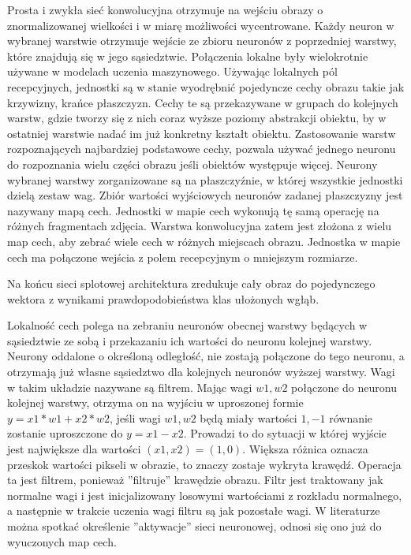 \documentclass[12pt,a4paper,twoside,titlepage,openright]{book}
\begin{document}
Prosta i zwykła sieć konwolucyjna otrzymuje na wejściu obrazy o znormalizowanej wielkości i w miarę możliwości wycentrowane. Każdy neuron w wybranej warstwie otrzymuje wejście ze zbioru neuronów z poprzedniej warstwy, które znajdują się w jego sąsiedztwie. Połączenia lokalne były wielokrotnie używane w modelach uczenia maszynowego. Używając lokalnych pól recepcyjnych, jednostki są w stanie wyodrębnić pojedyncze cechy obrazu takie jak krzywizny, krańce płaszczyzn. Cechy te są przekazywane w grupach do kolejnych warstw, gdzie tworzy się z nich coraz wyższe poziomy abstrakcji obiektu, by w ostatniej warstwie nadać im już konkretny kształt obiektu. Zastosowanie warstw rozpoznających najbardziej podstawowe cechy, pozwala używać jednego neuronu do rozpoznania wielu części obrazu jeśli obiektów występuje więcej. Neurony wybranej warstwy zorganizowane są na płaszczyźnie, w której wszystkie jednostki dzielą zestaw wag. Zbiór wartości wyjściowych neuronów zadanej płaszczyzny jest nazywany mapą cech. Jednostki w mapie cech wykonują tę samą operację na różnych fragmentach zdjęcia. Warstwa konwolucyjna zatem jest złożona z wielu map cech, aby zebrać wiele cech w różnych miejscach obrazu. Jednostka w mapie cech ma połączone wejścia z polem recepcyjnym o mniejszym rozmiarze.

Na końcu sieci splotowej architektura zredukuje cały obraz do pojedynczego wektora z wynikami prawdopodobieństwa klas ułożonych wgłąb.

Lokalność cech polega na zebraniu neuronów obecnej warstwy będących w sąsiedztwie ze sobą i przekazaniu ich wartości do neuronu kolejnej warstwy. Neurony oddalone o określoną odległość, nie zostają połączone do tego neuronu, a otrzymają już własne sąsiedztwo dla kolejnych neuronów wyższej warstwy. Wagi w takim układzie nazywane są filtrem. Mając wagi \(w1, w2\) połączone do neuronu kolejnej warstwy, otrzyma on na wyjściu w uproszonej formie \(y = x1*w1 + x2*w2 \), jeśli wagi \(w1, w2\) będą miały wartości \(1, -1\) równanie zostanie uproszczone do  \(y = x1 - x2 \). Prowadzi to do sytuacji w której wyjście jest największe dla wartości \( (x1,x2) = (1,0)\). Większa różnica oznacza przeskok wartości pikseli w obrazie, to znaczy zostaje wykryta krawędź. Operacja ta jest filtrem, ponieważ ''filtruje'' krawędzie obrazu. Filtr jest traktowany jak normalne wagi i jest inicjalizowany losowymi wartościami z rozkładu normalnego, a następnie w trakcie uczenia wagi filtru są jak pozostałe wagi. W literaturze można spotkać określenie ''aktywacje'' sieci neuronowej, odnosi się ono już do wyuczonych map cech.
\end{document}
